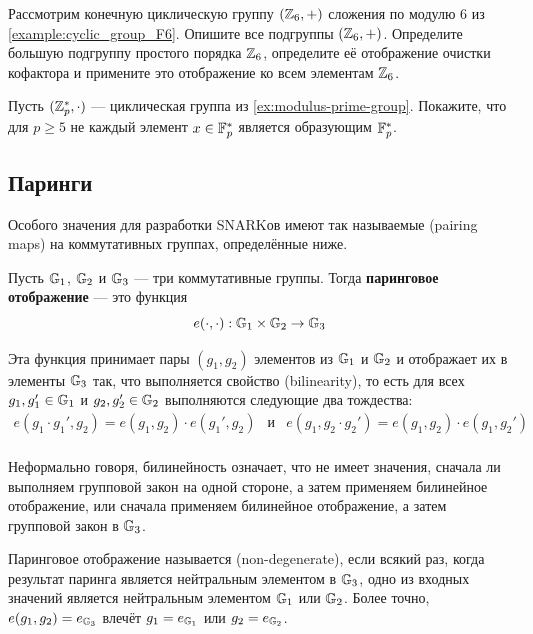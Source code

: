 \begin{exercise}
Рассмотрим конечную циклическую группу $(\mathbb{Z}_6,+)$ сложения по модулю $6$ из \examplename{} \ref{example:cyclic_group_F6}. Опишите все подгруппы $(\mathbb{Z}_6,+)$. Определите большую подгруппу простого порядка $\mathbb{Z}_6$, определите её отображение очистки кофактора и примените это отображение ко всем элементам $\mathbb{Z}_6$.
\end{exercise}
\begin{exercise}Пусть $(\mathbb{Z}_p^*,\cdot)$ — циклическая группа из \exercisename{} \ref{ex:modulus-prime-group}. Покажите, что для $p\geq 5$ не каждый элемент $x\in \mathbb{F}_p^*$ является образующим $\mathbb{F}_p^*$.
\end{exercise}
\subsection{Паринги}
Особого значения для разработки SNARKов имеют так называемые  (pairing maps) на коммутативных группах, определённые ниже.

\begin{definition}\label{def:pairing-map} 
Пусть $\mathbb{G}_1$, $\mathbb{G}_2$ и $\mathbb{G}_3$ — три коммутативные группы. Тогда \textbf{паринговое отображение} — это функция
\begin{equation}\label{pairing-map}
e(\cdot,\cdot): \mathbb{G}_1 \times \mathbb{G}_2 \to \mathbb{G}_3
\end{equation}

Эта функция принимает пары $(g_1,g_2)$ элементов из $\mathbb{G}_1$ и $\mathbb{G}_2$ и отображает их в элементы $\mathbb{G}_3$ так, что выполняется свойство  (bilinearity), то есть для всех $g_1,g_1'\in \mathbb{G}_1$ и $g_2, g_2'\in \mathbb{G}_2$ выполняются следующие два тождества:
\begin{equation}\label{eq:bilinearity}
\begin{array}{lcr}
e(g_1 \cdot g_1',g_2)= e(g_1,g_2)\cdot e(g_1',g_2) &\text{и}&
e(g_1,g_2 \cdot g_2')= e(g_1,g_2)\cdot e(g_1,g_2')\\
\end{array}
\end{equation}
\end{definition}

Неформально говоря, билинейность означает, что не имеет значения, сначала ли выполняем групповой закон на одной стороне, а затем применяем билинейное отображение, или сначала применяем билинейное отображение, а затем групповой закон в $\mathbb{G}_3$. 

Паринговое отображение называется  (non-degenerate), если всякий раз, когда результат паринга является нейтральным элементом в $\mathbb{G}_3$, одно из входных значений является нейтральным элементом $\mathbb{G}_1$ или $\mathbb{G}_2$. Более точно, $e(g_1,g_2)=e_{\mathbb{G}_3}$ влечёт $g_1=e_{\mathbb{G}_1}$ или $g_2=e_{\mathbb{G}_2}$.

